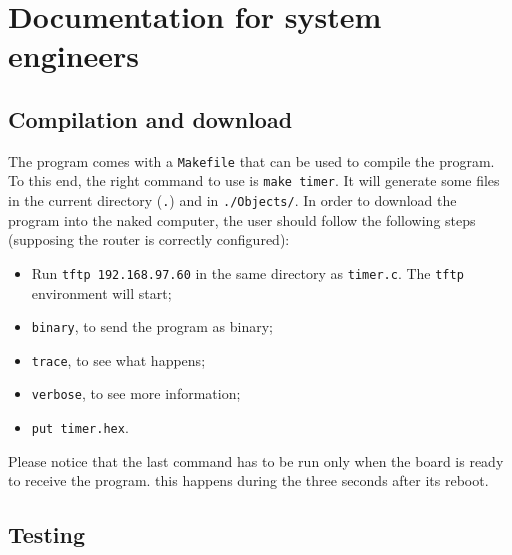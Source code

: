 \section{Documentation for system engineers}
\subsection{Compilation and download}
The program comes with a \texttt{Makefile} that can be used to compile the program. To this end, the right command to use is \texttt{make timer}. It will generate some files in the current directory (\texttt{.}) and in \texttt{./Objects/}. In order to download the program into the naked computer, the user should follow the following steps (supposing the router is correctly configured):
\begin{itemize}
	\item Run \texttt{tftp 192.168.97.60} in the same directory as \texttt{timer.c}. The \texttt{tftp} environment will start;
	\item \texttt{binary}, to send the program as binary;
	\item \texttt{trace}, to see what happens;
	\item \texttt{verbose}, to see more information;
	\item \texttt{put timer.hex}.
\end{itemize}
Please notice that the last command has to be run only when the board is ready to receive the program. this happens during the three seconds after its reboot.

\subsection{Testing}